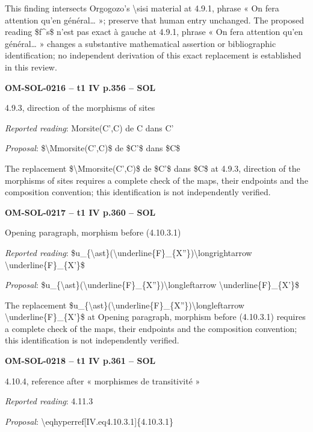 This finding intersects Orgogozo's \textbackslash{}sisi material at 4.9.1, phrase « On fera attention qu'en général… »; preserve that human entry unchanged. The proposed reading \$f\textasciicircum{}s\$ n'est pas exact à gauche at 4.9.1, phrase « On fera attention qu'en général… » changes a substantive mathematical assertion or bibliographic identification; no independent derivation of this exact replacement is established in this review.\par
\par\noindent\textbf{OM-SOL-0216 -- t1 IV p.356 -- SOL}\par
4.9.3, direction of the morphisms of sites\par
\emph{Reported reading}: Morsite(C',C) de C dans C'\par
\emph{Proposal}: \$\textbackslash{}Mmorsite(C',C)\$ de \$C'\$ dans \$C\$\par
The replacement \$\textbackslash{}Mmorsite(C',C)\$ de \$C'\$ dans \$C\$ at 4.9.3, direction of the morphisms of sites requires a complete check of the maps, their endpoints and the composition convention; this identification is not independently verified.\par
\par\noindent\textbf{OM-SOL-0217 -- t1 IV p.360 -- SOL}\par
Opening paragraph, morphism before (4.10.3.1)\par
\emph{Reported reading}: \$u\_\{\textbackslash{}ast\}(\textbackslash{}underline\{F\}\_\{X''\})\textbackslash{}longrightarrow \textbackslash{}underline\{F\}\_\{X'\}\$\par
\emph{Proposal}: \$u\_\{\textbackslash{}ast\}(\textbackslash{}underline\{F\}\_\{X''\})\textbackslash{}longleftarrow \textbackslash{}underline\{F\}\_\{X'\}\$\par
The replacement \$u\_\{\textbackslash{}ast\}(\textbackslash{}underline\{F\}\_\{X''\})\textbackslash{}longleftarrow \textbackslash{}underline\{F\}\_\{X'\}\$ at Opening paragraph, morphism before (4.10.3.1) requires a complete check of the maps, their endpoints and the composition convention; this identification is not independently verified.\par
\par\noindent\textbf{OM-SOL-0218 -- t1 IV p.361 -- SOL}\par
4.10.4, reference after « morphismes de transitivité »\par
\emph{Reported reading}: 4.11.3\par
\emph{Proposal}: \textbackslash{}eqhyperref[IV.eq4.10.3.1]\{4.10.3.1\}\par
